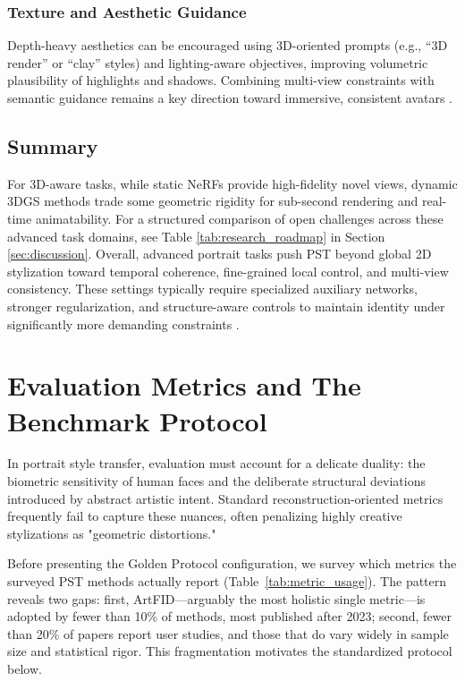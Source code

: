 \documentclass[journal]{IEEEtran}
\begin{document}
\subsubsection{Texture and Aesthetic Guidance}
\label{sec:advanced:3d:guidance}
Depth-heavy aesthetics can be encouraged using 3D-oriented prompts (e.g., ``3D render'' or ``clay'' styles) and lighting-aware objectives, improving volumetric plausibility of highlights and shadows. Combining multi-view constraints with semantic guidance remains a key direction toward immersive, consistent avatars \cite{jain2024stylesplat}.

\subsection{Summary}
\label{sec:advanced:summary}
For 3D-aware tasks, while static NeRFs provide high-fidelity novel views, dynamic 3DGS methods trade some geometric rigidity for sub-second rendering and real-time animatability. For a structured comparison of open challenges across these advanced task domains, see Table \ref{tab:research_roadmap} in Section \ref{sec:discussion}. Overall, advanced portrait tasks push PST beyond global 2D stylization toward temporal coherence, fine-grained local control, and multi-view consistency. These settings typically require specialized auxiliary networks, stronger regularization, and structure-aware controls to maintain identity under significantly more demanding constraints \cite{ye2024stylemastersy,jain2024stylesplat}.

\section{Evaluation Metrics and The Benchmark Protocol}
\label{sec:evaluation}

In portrait style transfer, evaluation must account for a delicate duality: the biometric sensitivity of human faces and the deliberate structural deviations introduced by abstract artistic intent. Standard reconstruction-oriented metrics frequently fail to capture these nuances, often penalizing highly creative stylizations as "geometric distortions."

Before presenting the Golden Protocol configuration, we survey which metrics the surveyed PST methods actually report (Table~\ref{tab:metric_usage}). The pattern reveals two gaps: first, ArtFID---arguably the most holistic single metric---is adopted by fewer than 10\% of methods, most published after 2023; second, fewer than 20\% of papers report user studies, and those that do vary widely in sample size and statistical rigor. This fragmentation motivates the standardized protocol below.
\end{document}
